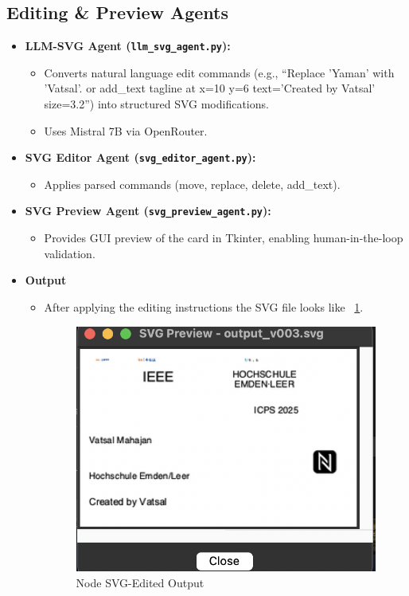 \subsection{Editing \& Preview Agents}
\begin{itemize}
	\item \textbf{LLM-SVG Agent (\texttt{llm\_svg\_agent.py}):}
	\begin{itemize}
		\item Converts natural language edit commands (e.g., “Replace 'Yaman' with 'Vatsal'. or add\_text tagline at x=10 y=6 text='Created by Vatsal' size=3.2”) into structured SVG modifications.
		\item Uses Mistral 7B via OpenRouter.
	\end{itemize}
	\item \textbf{SVG Editor Agent (\texttt{svg\_editor\_agent.py}):}
	\begin{itemize}
		\item Applies parsed commands (move, replace, delete, add\_text).
	\end{itemize}
	\item \textbf{SVG Preview Agent (\texttt{svg\_preview\_agent.py}):}
	\begin{itemize}
		\item Provides GUI preview of the card in Tkinter, enabling human-in-the-loop validation.
	\end{itemize}
		\item \textbf{Output} 
		\begin{itemize}
		\item After applying the editing instructions the SVG file looks like ~\ref{edit}. 
				\begin{figure}
			\begin{center}
				\includegraphics[width=0.6\linewidth]{Images/edit.png}
				\caption{Node SVG-Edited Output}
				\label{edit} 
			\end{center}
		\end{figure}
		\end{itemize}
	
\end{itemize}

